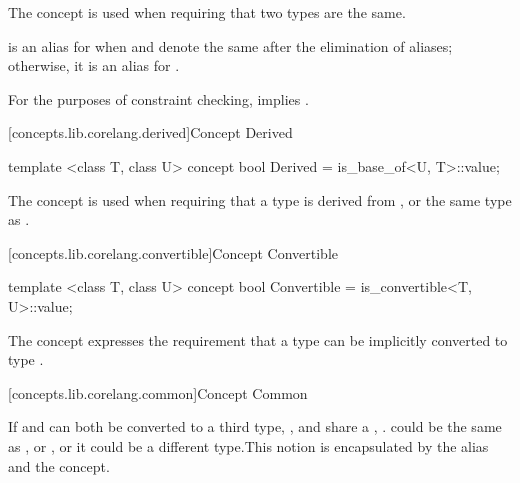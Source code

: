 \begin{addedblock}
\begin{itemdescr}
{\color{oldclr}
\pnum
The  concept is used when requiring that two types are the same.
}

\pnum
{} is an alias for  when  and 
denote the same  after the elimination of aliases; otherwise, it is an alias for
.

\pnum
\remarks For the purposes of constraint checking,  implies
.
\end{itemdescr}

[concepts.lib.corelang.derived]{Concept Derived}

%
\begin{itemdecl}
template <class T, class U>
concept bool Derived = is_base_of<U, T>::value;
\end{itemdecl}

\begin{itemdescr}
{\color{oldclr}
\pnum
The  concept is used when requiring that a type  is derived
from , or the same type as .
}
\end{itemdescr}

[concepts.lib.corelang.convertible]{Concept Convertible}

%
\begin{itemdecl}
template <class T, class U>
concept bool Convertible = is_convertible<T, U>::value;
\end{itemdecl}

\begin{itemdescr}
{\color{oldclr}
\pnum
The  concept expresses the requirement that a type
 can be implicitly converted to type .
}
\end{itemdescr}

[concepts.lib.corelang.common]{Concept Common}


\pnum
If  and  can both be  converted to a third type,
,  and  share a ,
. \enternote {} could be the same as , or , or
it could be a different type.\exitnote This notion is encapsulated by the
 alias and the  concept.


\end{addedblock}

